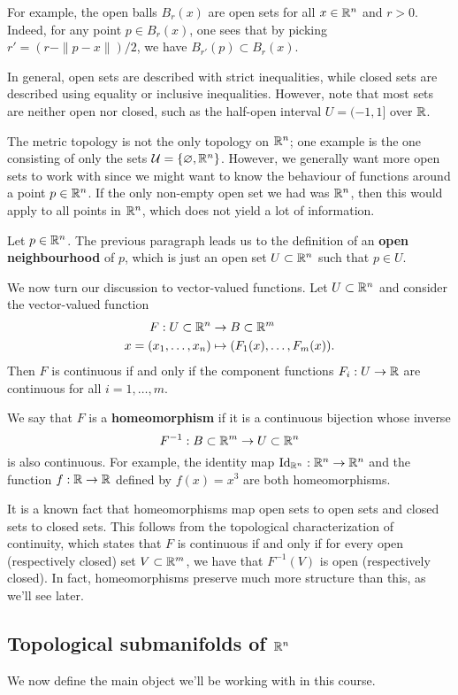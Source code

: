 For example, the open balls $B_r(x)$ are open sets for all 
$x \in \mathbb{R}^n$ and $r > 0$. Indeed, for any point $p \in 
B_r(x)$, one sees that by picking $r' = (r - \|p - x\|)/2$, 
we have $B_{r'}(p) \subset B_r(x)$. 

In general, open sets are described with strict inequalities, while closed 
sets are described using equality or inclusive inequalities. However, note 
that most sets are neither open nor closed, such as the half-open interval 
$U = (-1, 1]$ over $\mathbb{R}$. 

The metric topology is not the only topology on $\mathbb{R}^n$; one example is 
the one consisting of only the sets ${\cal U} = \{\varnothing, \mathbb{R}^n\}$.
However, we generally want more open sets to work with since we might want to 
know the behaviour of functions around a point $p \in \mathbb{R}^n$. If the 
only non-empty open set we had was $\mathbb{R}^n$, then this would apply to all points 
in $\mathbb{R}^n$, which does not yield a lot of information. 

Let $p \in \mathbb{R}^n$. The previous paragraph leads us to the definition of an 
{\bf open neighbourhood} of $p$, which is just an open set $U \subset \mathbb{R}^n$ 
such that $p \in U$. 

We now turn our discussion to vector-valued functions. Let $U \subset \mathbb{R}^n$ 
and consider the vector-valued function 
\begin{align*}
    F : U \subset \mathbb{R}^n &\to B \subset \mathbb{R}^m \\ 
    x = (x_1, \dots, x_n) &\mapsto (F_1(x), \dots, F_m(x)). 
\end{align*}
Then $F$ is continuous if and only if the component functions 
$F_i : U \to \mathbb{R}$ are continuous for all $i = 1, \dots, m$. 

We say that $F$ is a {\bf homeomorphism} if it is a continuous bijection 
whose inverse 
\[ F^{-1} : B \subset \mathbb{R}^m \to U \subset \mathbb{R}^n \] 
is also continuous. For example, the identity map $\operatorname{Id}_{\mathbb{R}^n} : \mathbb{R}^n \to \mathbb{R}^n$ 
and the function $f : \mathbb{R} \to \mathbb{R}$ defined by $f(x) = x^3$ are both homeomorphisms. 

It is a known fact that homeomorphisms map open sets to open sets and closed 
sets to closed sets. This follows from the topological characterization 
of continuity, which states that $F$ is continuous if and only if for 
every open (respectively closed) set $V \subset \mathbb{R}^m$, we have that 
$F^{-1}(V)$ is open (respectively closed). In fact, homeomorphisms preserve 
much more structure than this, as we'll see later. 

\subsection{Topological submanifolds of $\mathbb{R}^n$}\label{subsec:1.2}
We now define the main object we'll be working with in this course.

